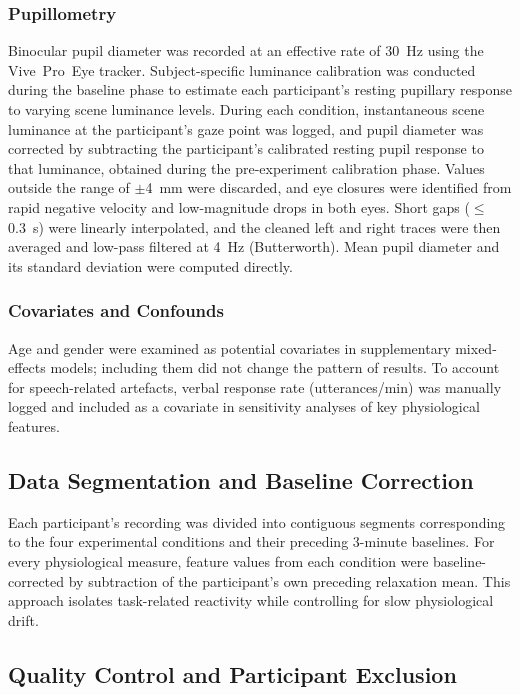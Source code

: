 \documentclass[lettersize,journal]{IEEEtran}
\begin{document}
\subsubsection{Pupillometry}
Binocular pupil diameter was recorded at an effective rate of 30~Hz using the Vive~Pro~Eye tracker. 
Subject-specific luminance calibration was conducted during the baseline phase to estimate each participant’s resting pupillary response to varying scene luminance levels. During each condition, instantaneous scene luminance at the participant’s gaze point was logged, and pupil diameter was corrected by subtracting the participant’s calibrated resting pupil response to that luminance, obtained during the pre-experiment calibration phase.
Values outside the range of $\pm$4~mm were discarded, and eye closures were identified from rapid negative velocity and low-magnitude drops in both eyes. 
Short gaps ($\leq$0.3~s) were linearly interpolated, and the cleaned left and right traces were then averaged and low-pass filtered at 4~Hz (Butterworth).
Mean pupil diameter and its standard deviation were computed directly.


\subsubsection{Covariates and Confounds}
Age and gender were examined as potential covariates in supplementary mixed-effects models; including them did not change the pattern of results.
To account for speech-related artefacts, verbal response rate (utterances/min) was manually logged and included as a covariate in sensitivity analyses of key physiological features.


\subsection{Data Segmentation and Baseline Correction}
Each participant’s recording was divided into contiguous segments corresponding to the four experimental conditions and their preceding 3-minute baselines. For every physiological measure, feature values from each condition were baseline-corrected by subtraction of the participant’s own preceding relaxation mean. This approach isolates task-related reactivity while controlling for slow physiological drift.

\subsection{Quality Control and Participant Exclusion}
\label{sec:qc}
\end{document}
